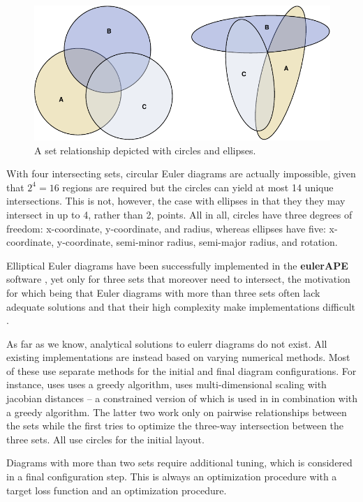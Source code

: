 \documentclass[
  headsepline=true,headings=standardclasses%
]{scrartcl}
\theoremstyle{definition}
\theoremstyle{definition}
\theoremstyle{definition}
\theoremstyle{remark}
\begin{document}
\begin{figure}
\centering
\includegraphics{thesis_files/figure-latex/impossible3-1.pdf}
\caption{\label{fig:impossible3}A set relationship depicted with circles and
ellipses.}
\end{figure}

With four intersecting sets, circular Euler diagrams are actually
impossible, given that \(2^4=16\) regions are required but the circles
can yield at most 14 unique intersections. This is not, however, the
case with ellipses in that they they may intersect in up to 4, rather
than 2, points. All in all, circles have three degrees of freedom:
x-coordinate, y-coordinate, and radius, whereas ellipses have five:
x-coordinate, y-coordinate, semi-minor radius, semi-major radius, and
rotation.

Elliptical Euler diagrams have been successfully implemented in the
\textbf{eulerAPE} software \autocite{micallef_2014}, yet only for three
sets that moreover need to intersect, the motivation for which being
that Euler diagrams with more than three sets often lack adequate
solutions and that their high complexity make implementations difficult
\autocite{micallef_2013}.

As far as we know, analytical solutions to eulerr diagrams do not exist.
All existing implementations are instead based on varying numerical
methods. Most of these use separate methods for the initial and final
diagram configurations. For instance, \textcite{micallef_2013} uses uses
a greedy algorithm, \textcite{wilkinson_2012} uses multi-dimensional
scaling with jacobian distances -- a constrained version of which is
used in \textcite{frederickson_2016} in combination with a greedy
algorithm. The latter two work only on pairwise relationships between
the sets while the first tries to optimize the three-way intersection
between the three sets. All use circles for the initial layout.

Diagrams with more than two sets require additional tuning, which is
considered in a final configuration step. This is always an optimization
procedure with a target loss function and an optimization procedure.
\end{document}
